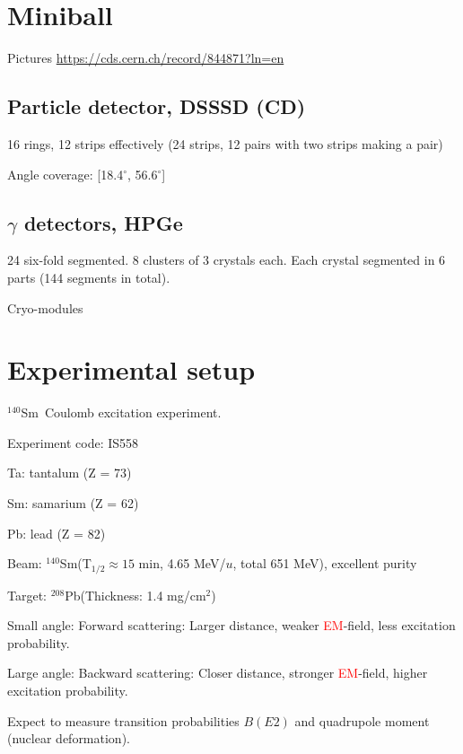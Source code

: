 \documentclass[twoside,english]{uiofysmaster/uiofysmaster}
\newcommand{\Sm}{$^{140}$Sm} %
\newcommand{\Pb}{$^{208}$Pb}
\begin{document}
\section{Miniball}

Pictures \url{https://cds.cern.ch/record/844871?ln=en}

\subsection{Particle detector, DSSSD (CD)}

16 rings, 12 strips effectively (24 strips, 12 pairs with two strips making a pair)

Angle coverage: [18.4$^\circ$, 56.6$^\circ$]


\subsection{\texorpdfstring{$\gamma$}{Gamma} detectors, HPGe}

24 six-fold segmented. 8 clusters of 3 crystals each. Each crystal segmented in 6 parts (144 segments in total).

\bigskip

Cryo-modules

\section{Experimental setup}
\Sm ~Coulomb excitation experiment.

Experiment code: IS558 

Ta: tantalum (Z = 73)

Sm: samarium (Z = 62)

Pb: lead (Z = 82) \newline



Beam: \Sm (T$_{1/2} \approx 15$ min, 4.65 MeV/$u$, total 651 MeV), excellent purity

Target: \Pb (Thickness: 1.4 mg/cm$^2$)


Small angle: Forward scattering: Larger distance, weaker \textcolor{red}{EM}-field, less excitation probability.

Large angle: Backward scattering: Closer distance, stronger \textcolor{red}{EM}-field, higher excitation probability. \newline


\bigskip

Expect to measure transition probabilities $B(E2)$ and quadrupole moment (nuclear deformation). 
\end{document}
